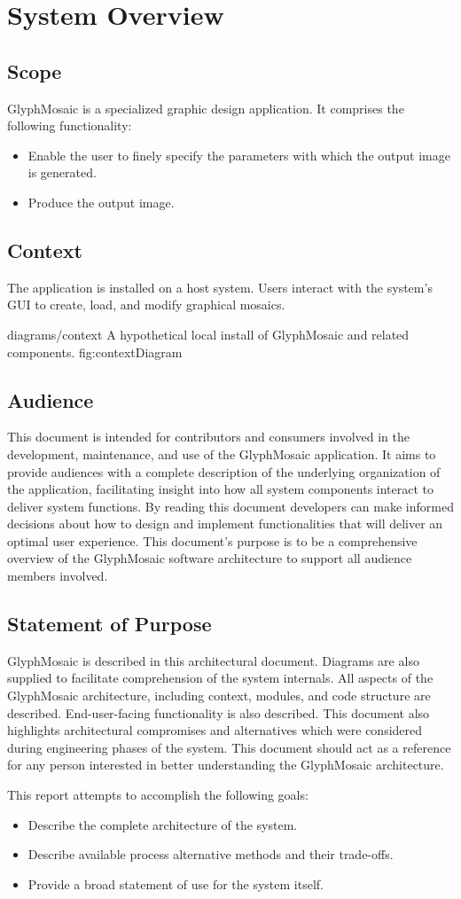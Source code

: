 \section{System Overview}
\subsection{Scope}
GlyphMosaic is a specialized graphic design application.
It comprises the following functionality:
\begin{itemize}
  \item Enable the user to finely specify the parameters with which the output image is generated.
  \item Produce the output image.
\end{itemize}


\subsection{Context}
The application is installed on a host system.
Users interact with the system's GUI to create, load, and modify graphical mosaics.

\sidiagram
{diagrams/context}
{A hypothetical local install of GlyphMosaic and related components.}
{fig:contextDiagram}
{\diagsize}


\subsection{Audience}
This document is intended for contributors and consumers involved in the development, maintenance, and use of the GlyphMosaic application.
It aims to provide audiences with a complete description of the underlying organization of the application, facilitating insight into how all system components interact to deliver system functions.
By reading this document developers can make informed decisions about how to design and implement functionalities that will deliver an optimal user experience.
This document's purpose is to be a comprehensive overview of the GlyphMosaic software architecture to support all audience members involved.


\subsection{Statement of Purpose}
GlyphMosaic is described in this architectural document.
Diagrams are also supplied to facilitate comprehension of the system internals.
All aspects of the GlyphMosaic architecture, including context, modules, and code structure are described.
End-user-facing functionality is also described.
This document also highlights architectural compromises and alternatives which were considered during engineering phases of the system.
This document should act as a reference for any person interested in better understanding the GlyphMosaic architecture.

This report attempts to accomplish the following goals:
\begin{itemize}
  \item Describe the complete architecture of the system.
  \item Describe available process alternative methods and their trade-offs.
  \item Provide a broad statement of use for the system itself.
\end{itemize}